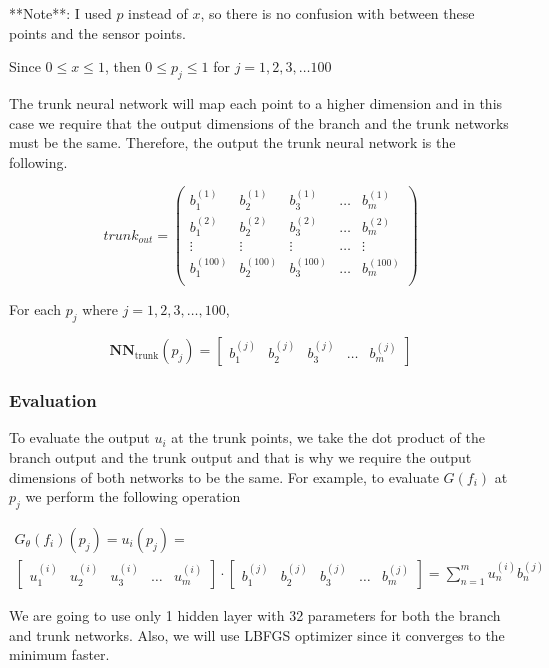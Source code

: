 \documentclass[a4paper, onecolumn, 12pt]{article}
\begin{document}
**Note**: I used $p$ instead of $x$, so there is no confusion with between these points and the sensor points.

Since $0 \le x \le 1$, then $0 \le p_j \le 1$ for $j=1, 2, 3, \dots 100$

The trunk neural network will map each point to a higher dimension and in this case we 
require that the output dimensions of the branch and the trunk networks must be the same. 
Therefore, the output the trunk neural network is the following.

$$
trunk_{out} = \begin{pmatrix}
b^{(1)}_1 & b^{(1)}_2 & b^{(1)}_3 & \dots & b^{(1)}_m\\
b^{(2)}_1 & b^{(2)}_2 & b^{(2)}_3 & \dots & b^{(2)}_m\\
\vdots & \vdots & \vdots & \dots & \vdots \\
b^{(100)}_1 & b^{(100)}_2 & b^{(100)}_3 & \dots & b^{(100)}_m\\
\end{pmatrix}
$$


For each $p_j$ where $j=1, 2, 3, \dots, 100$,

$$
\mathbf{NN}_{\text{trunk}}(p_j) = \begin{bmatrix}
b^{(j)}_1 & b^{(j)}_2 & b^{(j)}_3 & \dots & b^{(j)}_m
\end{bmatrix}
$$

\subsubsection{Evaluation}
To evaluate the output $u_i$ at the trunk points,
we take the dot product of the branch output and the trunk output and that is why we require the
output dimensions of both networks to be the same. For example,
to evaluate $G(f_i)$ at $p_j$ we perform the following operation

\begin{multline}
G_{\theta}(f_i)(p_j) = u_i(p_j) = \\ 
\begin{bmatrix}
u^{(i)}_1 & u^{(i)}_2 & u^{(i)}_3 & \dots & u^{(i)}_m
\end{bmatrix} \cdot 
\begin{bmatrix} 
b^{(j)}_1 & b^{(j)}_2 & b^{(j)}_3 & \dots & b^{(j)}_m
\end{bmatrix}
= \sum_{n=1}^{m} u^{(i)}_n b^{(j)}_n
\end{multline}

We are going to use only 1 hidden layer with 32 parameters for both the branch and trunk networks. 
Also, we will use LBFGS optimizer since it converges to the minimum faster.
\end{document}
